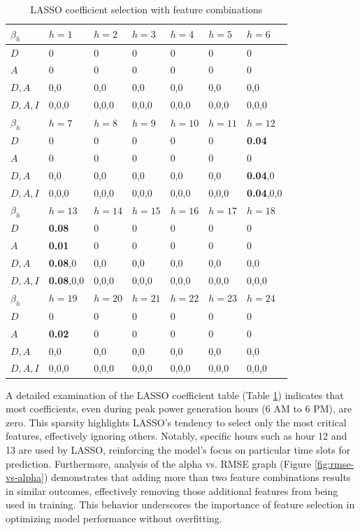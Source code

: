 \begin{table}[h]
    \centering
    \caption{LASSO coefficient selection with feature combinations}
    \begin{tabular}{|l|l|l|l|l|l|l|} 
    \hline
    $\beta_h$ & $h=1$ & $h=2$ & $h=3$ & $h=4$ & $h=5$ & $h=6$ \\ 
    \hline
    $D$ & 0 & 0 & 0 & 0 & 0 & 0 \\ 
    \hline
    $A$ & 0 & 0 & 0 & 0 & 0 & 0 \\ 
    \hline
    $D,A$ & 0,0 & 0,0 & 0,0 & 0,0 & 0,0 & 0,0 \\ 
    \hline
    $D,A,I$ & 0,0,0 & 0,0,0 & 0,0,0 & 0,0,0 & 0,0,0 & 0,0,0 \\ 
    \hline
    $\beta_h$ & $h=7$ & $h=8$ & $h=9$ & $h=10$ & $h=11$ & $h=12$ \\ 
    \hline
    $D$ & 0 & 0 & 0 & 0 & 0 & \textbf{0.04} \\ 
    \hline
    $A$ & 0 & 0 & 0 & 0 & 0 & 0 \\ 
    \hline
    $D,A$ & 0,0 & 0,0 & 0,0 & 0,0 & 0,0 & \textbf{0.04},0 \\ 
    \hline
    $D,A,I$ & 0,0,0 & 0,0,0 & 0,0,0 & 0,0,0 & 0,0,0 & \textbf{0.04},0,0 \\ 
    \hline
    $\beta_h$ & $h=13$ & $h=14$ & $h=15$ & $h=16$ & $h=17$ & $h=18$ \\ 
    \hline
    $D$ & \textbf{0.08} & 0 & 0 & 0 & 0 & 0 \\ 
    \hline
    $A$ & \textbf{0.01} & 0 & 0 & 0 & 0 & 0 \\ 
    \hline
    $D,A$ & \textbf{0.08},0 & 0,0 & 0,0 & 0,0 & 0,0 & 0,0 \\ 
    \hline
    $D,A,I$ & \textbf{0.08},0,0 & 0,0,0 & 0,0,0 & 0,0,0 & 0,0,0 & 0,0,0 \\ 
    \hline
    $\beta_h$ & $h=19$ & $h=20$ & $h=21$ & $h=22$ & $h=23$ & $h=24$ \\ 
    \hline
    $D$ & 0 & 0 & 0 & 0 & 0 & 0 \\ 
    \hline
    $A$ & \textbf{0.02} & 0 & 0 & 0 & 0 & 0 \\ 
    \hline
    $D,A$ & 0,0 & 0,0 & 0,0 & 0,0 & 0,0 & 0,0 \\ 
    \hline
    $D,A,I$ & 0,0,0 & 0,0,0 & 0,0,0 & 0,0,0 & 0,0,0 & 0,0,0 \\ 
    \hline
    \end{tabular}
    \label{tab:coeff_lasso}
\end{table}

A detailed examination of the LASSO coefficient table (Table \ref{tab:coeff_lasso}) indicates that most coefficients, even during peak power generation hours (6 AM to 6 PM), are zero. This sparsity highlights LASSO's tendency to select only the most critical features, effectively ignoring others. Notably, specific hours such as hour 12 and 13 are used by LASSO, reinforcing the model's focus on particular time slots for prediction. Furthermore, analysis of the alpha vs. RMSE graph (Figure \ref{fig:rmse-vs-alpha}) demonstrates that adding more than two feature combinations results in similar outcomes, effectively removing those additional features from being used in training. This behavior underscores the importance of feature selection in optimizing model performance without overfitting.

